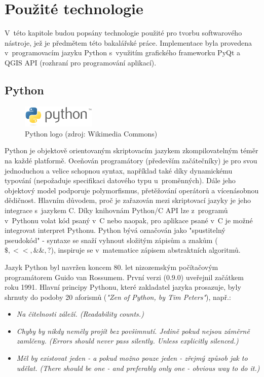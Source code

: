 \chapter{Použité technologie}
\label{3-technologie}

V~této kapitole budou popsány technologie použité pro tvorbu
softwarového nástroje, jež je předmětem této bakalářské
práce. Implementace byla provedena v~programovacím jazyku Python
s~využitím grafického frameworku PyQt a QGIS API (rozhraní pro
programování aplikací).

\section{Python}
\begin{figure}[H] \centering
      \includegraphics[width=100pt]{./pictures/python.png}
      \caption[Python logo]{Python logo (zdroj: Wikimedia Commons)}
      \label{fig:python}
\end{figure}
  
Python je objektově orientovaným skriptovacím jazykem zkompilovatelným
téměr na každé platformě. Oceňován programátory (především
začátečníky) je pro svou jednoduchou a velice schopnou syntax,
například také díky dynamickému typování (nepožaduje specifikaci
datového typu u~proměnných). Dále jeho objektový model podporuje
polymorfismus, přetěžování operátorů a vícenásobnou dědičnost. Hlavním
důvodem, proč je zařazován mezi skriptovací jazyky je jeho integrace
s~jazykem C. Díky knihovnám Python/C API lze z~programů v~Pythonu
volat kód psaný v~C nebo naopak, pro aplikace psané v~C je možné
integrovat interpret Pythonu.  Python bývá označován jako "spustitelný
pseudokód" - syntaxe se snaží vyhnout složitým zápisům a znakům ($\$,
<<, \&\&, ?$), inspiruje se v~matematice zápisem abstraktních
algoritmů.\cite{learningPython}

Jazyk Python byl navržen koncem 80. let nizozemským počítačovým
programátorem Guido van Rossumem. První verzi (0.9.0) uveřejnil
začátkem roku 1991. Hlavní principy Pythonu, které zakladatel jazyka
prosazuje, byly shrnuty do podoby 20 aforismů (\textit{"Zen of Python,
by Tim Peters"}), např.:

\begin{itemize}

	\item \textit{Na čitelnosti záleží. (Readability counts.)}
			
	\item \textit{Chyby by nikdy neměly projít bez
povšimnutí. Jedině pokud nejsou záměrně zamlčeny. (Errors should never
pass silently. Unless explicitly silenced.)}
		
	\item \textit{Měl by existovat jeden - a pokud možno pouze
jeden - zřejmý způsob jak to udělat. (There should be one - and
preferably only one - obvious way to do it.)}
\end{itemize}

